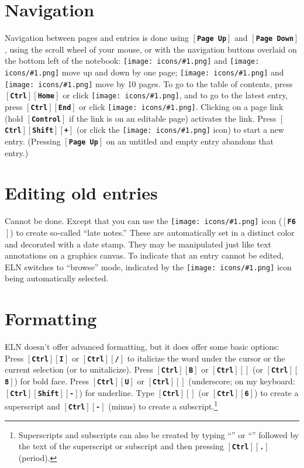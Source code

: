 \documentclass[11pt]{report}
\def\keystroke#1{$\left[\right.\!${\tt\bfseries #1}$\!\left.\right]$}
\def\key#1{\keystroke{#1}}
\def\keycombo#1#2{\keystroke{#1}\keystroke{#2}}
\def\keycontrol#1{\keycombo{Ctrl}{#1}}
\def\controlshift#1{\keystroke{Ctrl}\keystroke{Shift}\keystroke{#1}}
\def\keyctrlhat{\keycontrol{\char94}}
\def\keyhat{``{\tt\char94}''}
\def\keyctrlunderscore{\keycontrol{\char95}}
\def\keyunderscore{``{\tt\char95}''}
\def\icon#1{\raise-2pt\hbox{\texttt{[image: icons/\#1.png]}}}
\begin{document}
\section{Navigation}

Navigation between pages and entries is done using \key{Page Up} and
\key{Page Down}, using the scroll wheel of your mouse, or with the
navigation buttons overlaid on the bottom left of the notebook:
\icon{nav-prev} and \icon{nav-next} move up and down by one page;
\icon{nav-p10} and \icon{nav-n10} move by 10 pages. To go
to the table of contents, press \keycontrol{Home} or click
\icon{nav-toc}, and to go to the latest entry, press \keycontrol{End}
or click \icon{nav-end}. Clicking on a page link (hold \key{Control}
if the link is on an editable page) activates the link. Press
\controlshift{+} (or click the \icon{nav-plus} icon) to start a new
entry. (Pressing
\key{Page Up} on an untitled and empty  entry  abandons that 
entry.)

\section{Editing old entries}

Cannot be done. Except that you can use the \icon{note} icon (\key{F6}) to
create so-called ``late notes.'' These are automatically set in a
distinct color and decorated with a date stamp. They
may be manipulated just like text annotations on a graphics canvas. To
indicate that an entry cannot be edited, ELN switches to ``browse''
mode, indicated by the \icon{browse} icon being automatically selected.

\section{Formatting}

ELN doesn't offer advanced formatting, but it does offer some basic
options: Press \keycontrol{I} or \keycontrol{/} to italicize the word
under the cursor or the current selection (or to unitalicize). Press
\keycontrol{B} or \keycontrol{*} (or \keycontrol{8}) for bold face. Press
\keycontrol{U} or \keyctrlunderscore{} (underscore; on my keyboard: \controlshift{-})
for underline. Type \keyctrlhat{} (or \keycontrol{6}) to create a
superscript and \keycontrol{-} (minus) to create a
subscript.\footnote{Superscripts and subscripts can also be created by
  typing \keyhat{} or \keyunderscore{} followed by the text of the
  superscript or subscript and then pressing \keycontrol{.} (period).}
\end{document}
